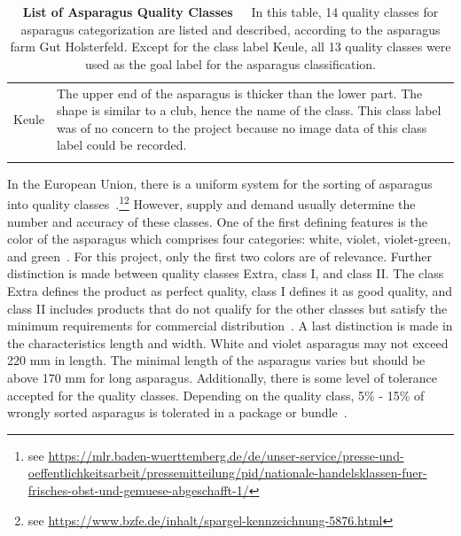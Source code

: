 \begin{table}[!ht]
{\begin{tabular}{l p{14cm}}
		\smallskip
		Keule & The upper end of the asparagus is thicker than the lower part. The shape                 is similar to a club, hence the name of the class. This class label was of no concern         to the project because no image data of this class label could be recorded. \\
		\\
		\hline
	\end{tabular}%
	}
	\caption[List of Asparagus Quality Classes]{\textbf{List of Asparagus Quality Classes}~~~In this table, 14 quality classes for asparagus categorization are listed and described, according to the asparagus farm Gut Holsterfeld. Except for the class label Keule, all 13 quality classes were used as the goal label for the asparagus classification.}
	\label{tab:AsparagusLabels}
\end{table}

In the European Union, there is a uniform system for the sorting of asparagus into quality classes~\citep{euspargelnorm,unspargelnorm}.\footnote{see \url{https://mlr.baden-wuerttemberg.de/de/unser-service/presse-und-oeffentlichkeitsarbeit/pressemitteilung/pid/nationale-handelsklassen-fuer-frisches-obst-und-gemuese-abgeschafft-1/}}\footnote{see \url{https://www.bzfe.de/inhalt/spargel-kennzeichnung-5876.html}} However, supply and demand usually determine the number and accuracy of these classes. One of the first defining features is the color of the asparagus which comprises four categories: white, violet, violet-green, and green~\citep{euspargelnorm}. For this project, only the first two colors are of relevance. Further distinction is made between quality classes Extra, class I, and class II. The class Extra defines the product as perfect quality, class I defines it as good quality, and class II includes products that do not qualify for the other classes but satisfy the minimum requirements for commercial distribution~\citep{euspargelnorm}. A last distinction is made in the characteristics length and width. White and violet asparagus may not exceed 220 mm in length. The minimal length of the asparagus varies but should be above 170 mm for long asparagus. Additionally, there is some level of tolerance accepted for the quality classes. Depending on the quality class, 5\% - 15\% of wrongly sorted asparagus is tolerated in a package or bundle~\citep{euspargelnorm}.

